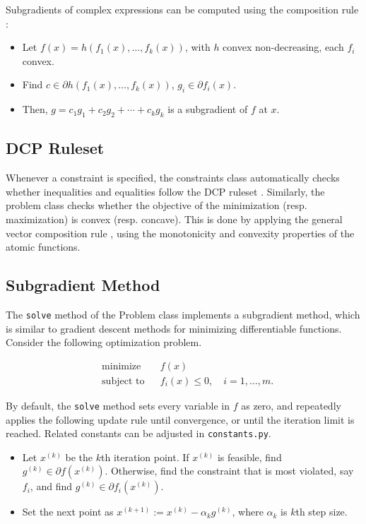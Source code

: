 \documentclass[12pt]{article}
\begin{document}
Subgradients of complex expressions can be computed using the composition rule \cite{subg}:
\begin{itemize}
\item Let $f(x) = h(f_1(x), \ldots, f_k(x))$, with $h$ convex non-decreasing,
  each $f_i$ convex.
\item Find $c \in \partial h(f_1(x), \ldots, f_k(x))$, $g_i \in \partial
  f_i(x)$.
\item Then, $g = c_1 g_1 + c_2 g_2 + \cdots + c_k g_k$ is a subgradient of $f$ at $x$.
\end{itemize}

\subsection{DCP Ruleset}
\label{dcp}
Whenever a constraint is specified, the constraints class automatically checks whether inequalities and equalities follow the DCP ruleset \cite{guide}. Similarly, the problem class checks whether the objective of the minimization (resp. maximization) is convex (resp. concave). This is done by applying the general vector composition rule \cite{cvx}, using the monotonicity and convexity properties of the atomic functions.

\subsection{Subgradient Method}
\label{subgmethod}
The \verb'solve' method of the Problem class implements a subgradient method, which is similar to gradient descent methods for minimizing differentiable functions. Consider the following optimization problem.

\begin{equation*}
\begin{aligned}
&\mbox{minimize}&&f(x)\\
&\mbox{subject to}&&f_i(x) \le 0, \quad i = 1, \ldots, m.
\end{aligned}
\end{equation*}

By default, the \verb'solve' method sets every variable in $f$ as zero, and repeatedly applies the following update rule until convergence, or until the iteration limit is reached. Related constants can be adjusted in \verb'constants.py'.

\begin{itemize}
\item Let $x^{(k)}$ be the $k$th iteration point. If $x^{(k)}$ is feasible, find $g^{(k)} \in \partial f(x^{(k)})$. Otherwise, find the constraint that is most violated, say $f_i$, and find $g^{(k)} \in \partial f_i(x^{(k)})$.
\item Set the next point as $x^{(k+1)}:=x^{(k)}-\alpha_k g^{(k)}$, where $\alpha_k$ is $k$th step size.
\end{itemize}
\end{document}
